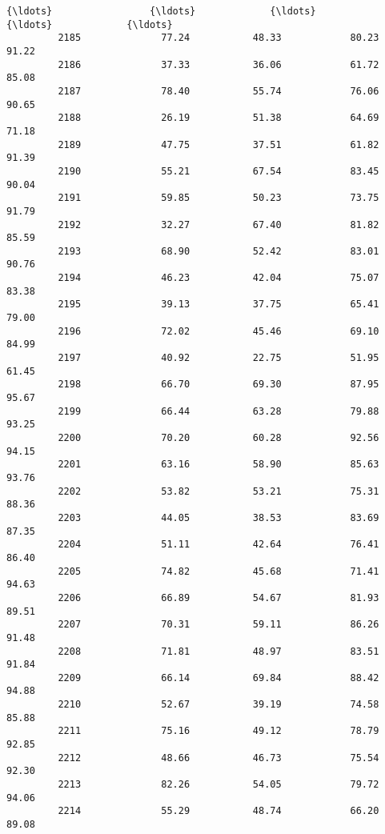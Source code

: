 \documentclass[11pt]{llncs}
\begin{document}
\begin{Verbatim}[commandchars=\\\{\}]
         {\ldots}                 {\ldots}             {\ldots}              {\ldots}             {\ldots}   
         2185              77.24           48.33            80.23           91.22   
         2186              37.33           36.06            61.72           85.08   
         2187              78.40           55.74            76.06           90.65   
         2188              26.19           51.38            64.69           71.18   
         2189              47.75           37.51            61.82           91.39   
         2190              55.21           67.54            83.45           90.04   
         2191              59.85           50.23            73.75           91.79   
         2192              32.27           67.40            81.82           85.59   
         2193              68.90           52.42            83.01           90.76   
         2194              46.23           42.04            75.07           83.38   
         2195              39.13           37.75            65.41           79.00   
         2196              72.02           45.46            69.10           84.99   
         2197              40.92           22.75            51.95           61.45   
         2198              66.70           69.30            87.95           95.67   
         2199              66.44           63.28            79.88           93.25   
         2200              70.20           60.28            92.56           94.15   
         2201              63.16           58.90            85.63           93.76   
         2202              53.82           53.21            75.31           88.36   
         2203              44.05           38.53            83.69           87.35   
         2204              51.11           42.64            76.41           86.40   
         2205              74.82           45.68            71.41           94.63   
         2206              66.89           54.67            81.93           89.51   
         2207              70.31           59.11            86.26           91.48   
         2208              71.81           48.97            83.51           91.84   
         2209              66.14           69.84            88.42           94.88   
         2210              52.67           39.19            74.58           85.88   
         2211              75.16           49.12            78.79           92.85   
         2212              48.66           46.73            75.54           92.30   
         2213              82.26           54.05            79.72           94.06   
         2214              55.29           48.74            66.20           89.08   
         

\end{Verbatim}
\end{document}
